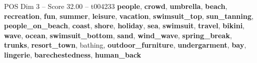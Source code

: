 \begin{textsample}{POS Dim 3 – Score 32.00 – t004233}  \label{ex:f3_pos_002}
\textbf{people}, \textbf{crowd}, \textbf{umbrella}, \textbf{beach}, \textbf{recreation}, \textbf{fun}, \textbf{summer}, \textbf{leisure}, \textbf{vacation}, \textbf{swimsuit\_top}, \textbf{sun\_tanning}, \textbf{people\_on\_beach}, \textbf{coast}, \textbf{shore}, \textbf{holiday}, \textbf{sea}, \textbf{swimsuit}, \textbf{travel}, \textbf{bikini}, \textbf{wave}, \textbf{ocean}, \textbf{swimsuit\_bottom}, \textbf{sand}, \textbf{wind\_wave}, \textbf{spring\_break}, \textbf{trunks}, \textbf{resort\_town}, bathing, \textbf{outdoor\_furniture}, \textbf{undergarment}, \textbf{bay}, \textbf{lingerie}, \textbf{barechestedness}, \textbf{human\_back}

\end{textsample}
